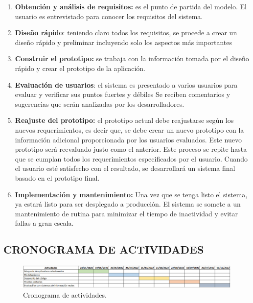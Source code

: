 \documentclass[12pt,a4paper,final]{article}
\begin{document}
	\begin{enumerate}
		\item \textbf{Obtención y análisis de requisitos:} es el punto de partida del modelo. El usuario es entrevistado para conocer los requisitos del sistema.
		
		\item \textbf{Diseño rápido}: teniendo claro todos los requisitos, se procede a crear un diseño rápido y preliminar incluyendo solo los aspectos más importantes 
		
		\item\textbf{ Construir el prototipo:} se trabaja con la información tomada por el diseño rápido y crear el prototipo de la aplicación.
		
		\item \textbf{Evaluación de usuarios}: el sistema es presentado a varios usuarios para evaluar y verificar sus puntos fuertes y débiles Se reciben comentarios y sugerencias que serán analizadas por los desarrolladores.
		
		\item \textbf{Reajuste del prototipo:} el prototipo actual debe reajustarse según los nuevos requerimientos, es decir que, se debe crear un nuevo prototipo con la información adicional proporcionada por los usuarios evaluados. Este nuevo prototipo será reevaluado justo como el anterior. Este proceso se repite hasta que se cumplan todos los requerimientos especificados por el usuario. Cuando el usuario esté satisfecho con el resultado, se desarrollará un sistema final basado en el prototipo final. 
		
		\item \textbf{Implementación y mantenimiento:} Una vez que se tenga listo el sistema, ya estará listo para ser desplegado a producción. El sistema se somete a un mantenimiento de rutina para minimizar el tiempo de inactividad y evitar fallas a gran escala.
		
	\end{enumerate}
	
	\newpage
	
	\begin{landscape}
	
	\section{CRONOGRAMA DE ACTIVIDADES}
	\begin{figure}[h!]
		\centering
		\includegraphics[width=\linewidth]{images/cronograma.png}
		\caption{Cronograma de actividades.}
		\label{fig:usecaseEasyIoT}
	\end{figure}
	
	\end{landscape}
	
\end{document}
